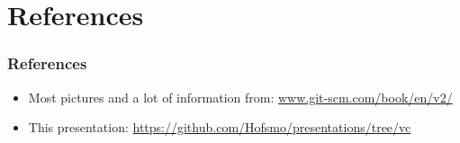 \section[References]{References}
\begin{frame}
	\frametitle{References}
	\begin{itemize}
		\item Most pictures and a lot of information from:
				\url{www.git-scm.com/book/en/v2/}
		\item This presentation:
				\url{https://github.com/Hofsmo/presentations/tree/vc}
	\end{itemize}
\end{frame}
